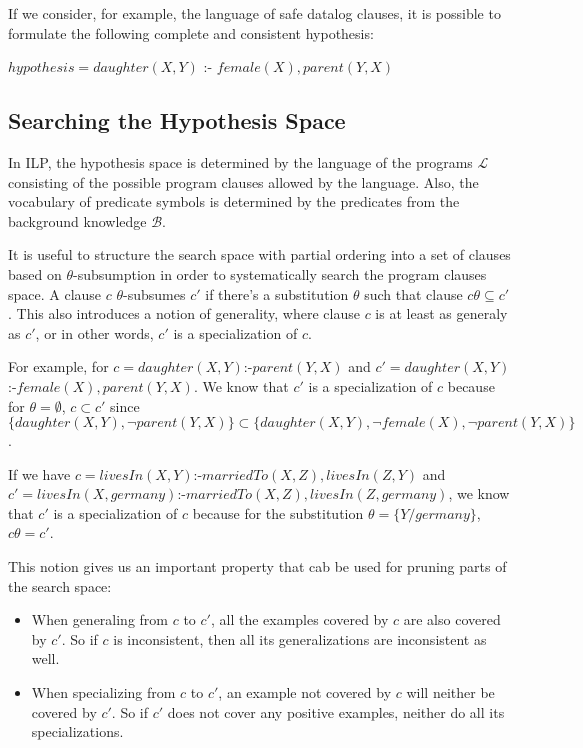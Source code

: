 If we consider, for example, the language of safe datalog clauses, it is possible to formulate the following complete
and consistent hypothesis:

\begin{center}
  $hypothesis = daughter(X,Y)$ :- $female(X),parent(Y,X)$ 
\end{center}

\subsection{Searching the Hypothesis Space}

In ILP, the hypothesis space is determined by the language of the programs $\mathcal{L}$ consisting of the possible
program clauses allowed by the language. Also, the vocabulary of predicate symbols is determined by the predicates from
the background knowledge $\mathcal{B}$.

It is useful to structure the search space with partial ordering into a set of clauses based on $\theta$-subsumption in
order to systematically search the program clauses space. A clause $c$ $\theta$-subsumes $c'$ if there's a
substitution $\theta$ such that clause $c\theta \subseteq c'$. This also introduces a notion of generality, where
clause $c$ is at least as generaly as $c'$, or in other words, $c'$ is a specialization of $c$.

For example, for $c=daughter(X,Y)$:-$parent(Y,X)$ and $c'=daughter(X,Y)$:-$female(X),parent(Y,X)$. We know that $c'$ is
a specialization of $c$ because for $\theta=\emptyset$, $c \subset c'$ since $\{daughter(X,Y),\neg parent(Y,X)\}
\subset \{daughter(X,Y),\neg female(X),\neg parent(Y,X)\}$.

If we have $c = livesIn(X,Y)$:-$marriedTo(X,Z),livesIn(Z,Y)$ and $c' =
livesIn(X,germany)$:-$marriedTo(X,Z),livesIn(Z,germany)$, we know that $c'$ is a specialization of $c$ because for the
substitution $\theta=\{Y/germany\}$, $c\theta=c'$.

This notion gives us an important property that cab be used for pruning parts of the search space:

\begin{itemize}
 \item When generaling from $c$ to $c'$, all the examples covered by $c$ are also covered by $c'$. So if $c$ is
inconsistent, then all its generalizations are inconsistent as well.
  \item When specializing from $c$ to $c'$, an example not covered by $c$ will neither be covered by $c'$. So if $c'$
does not cover any positive examples, neither do all its specializations.
\end{itemize}

